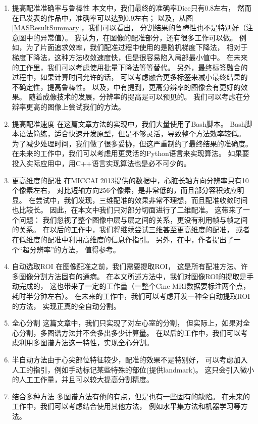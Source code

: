 \begin{enumerate}
  \item{提高配准准确率与鲁棒性}
    本文中，我们最终的准确率Dice只有0.8左右，
    然而在已发表的作品中，准确率可以达到0.9左右；
    以及，从图\ref{MASResultSummary}，我们可以看出，
    分割结果的鲁棒性也不是特别好（注意图中的异常值）。
    我认为，在图像的配准部分，还有很多工作可以做。
    例如，为了片面追求效率，我们配准过程中使用的是随机梯度下降法，
    相对于梯度下降法，这种方法收敛速度快，但是很容易陷入局部最小值中。
    在未来的工作里，我们可以考虑使用批量下降法等等替代。
    另外，最终标签融合的过程中，如果计算时间允许的话，
    可以考虑融合更多标签来减小最终结果的不确定性，提高鲁棒性。
    以及，\cite{HigherResolution}中有提到，更高分辨率的图像会有更好的效果。
    随着成像技术的发展，分辨率的提高是可以预见的。
    我们可以考虑在分辨率更高的图像上尝试我们的方法。
  \item{提高配准速度}
    在这篇文章方法的实现中，我们大量使用了Bash脚本。
    Bash脚本语法简练，适合快速开发原型，但是不够灵活，导致整个方法效率较低。
    为了减少处理时间，我们做了很多妥协，但这严重制约了最终结果的准确度。
    在未来的工作中，我们可以考虑用更灵活的Python语言来实现算法。
    如果要投入实际应用中，用C++语言实现算法也是必不可少的。
  \item{更高维度的配准}
    在MICCAI 2013提供的数据中，心脏长轴方向分辨率只有10个像素左右，
    对比短轴方向256个像素，是非常低的，而且部分容积效应明显。
    在尝试中，我们发现，三维配准的效果非常不理想，而且配准收敛时间也比较长。
    因此，在本文中我们只对部分切面进行了二维配准。
    这带来了一个问题：
    我们忽视了整个图像中层与层之间的关系，更没有利用帧与帧之间的关系。
    在以后的工作中，我们将继续尝试三维甚至更高维度的配准，
    或者在低维度的配准中利用高维度的信息作指引。
    另外，在\cite{ShiSuperResolution2013}中，作者提出了一个``超分辨率''的方法，
    值得参考。
  \item{自动选取ROI}
    在图像配准之前，我们需要提取ROI，
    这是所有配准方法、许多图像分割方法固有的通病。
    在本文所述方法中，我们对图像ROI的提取是手动完成的，
    这也带来了一定的工作量（一整个Cine MRI数据要标注两个点，耗时半分钟左右）。
    在未来的工作中，我们可以考虑开发一种全自动提取ROI的方法，
    实现正真的全自动分割。
  \item{全心分割}
    这篇文章中，我们只实现了对左心室的分割，
    但实际上，如果对全心分割，多图谱方法并不会多出多少计算量。
    在以后的工作中，我们可以考虑利用多图谱方法这一特性，实现全心分割。
  \item{半自动方法}由于心尖部位特征较少，配准的效果不是特别好，
    可以考虑加入人工的指引，例如手动标记某些特殊的部位(提供landmark)。
    这只会引入微小的人工工作量，并且可以较大提高分割精度。
  \item{结合多种方法}
    多图谱方法有他的有点，但是也有一些固有的缺陷。
    在未来的工作中，我们可以考虑结合使用其他方法，
    例如水平集方法和机器学习等方法。
\end{enumerate}
